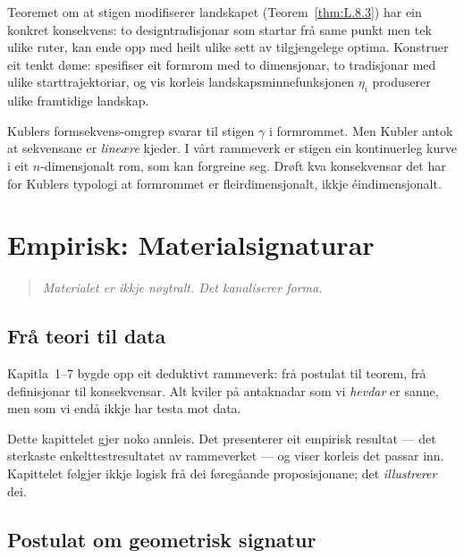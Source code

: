 \begin{exercise}[Nivå 3]\label{ex:7.5}
Teoremet om at stigen modifiserer landskapet (Teorem~\ref{thm:L.8.3})
har ein konkret konsekvens: to designtradisjonar som startar frå
same punkt men tek ulike ruter, kan ende opp med heilt ulike sett
av tilgjengelege optima. Konstruer eit tenkt døme: spesifiser eit
formrom med to dimensjonar, to tradisjonar med ulike starttrajektoriar,
og vis korleis landskapsminnefunksjonen $\eta_i$ produserer ulike
framtidige landskap.
\end{exercise}

\begin{exercise}[Nivå 3]\label{ex:7.6}
Kublers formsekvens-omgrep svarar til stigen $\gamma$ i
formrommet. Men Kubler antok at sekvensane er \emph{lineære}
kjeder. I vårt rammeverk er stigen ein kontinuerleg kurve i eit
$n$-dimensjonalt rom, som kan forgreine seg. Drøft kva
konsekvensar det har for Kublers typologi at formrommet er
fleirdimensjonalt, ikkje éindimensjonalt.
\end{exercise}


\chapter{Empirisk: Materialsignaturar}
\label{chap:empirisk}

\begin{quote}
\itshape
Materialet er ikkje nøytralt. Det kanaliserer forma.
\end{quote}

\section{Frå teori til data}

Kapitla~1--7 bygde opp eit deduktivt rammeverk: frå postulat til
teorem, frå definisjonar til konsekvensar. Alt kviler på
antaknadar som vi \emph{hevdar} er sanne, men som vi endå ikkje
har testa mot data.

Dette kapittelet gjer noko annleis. Det presenterer eit empirisk
resultat --- det sterkaste enkelttestresultatet av rammeverket ---
og viser korleis det passar inn. Kapittelet følgjer ikkje logisk
frå dei føregåande proposisjonane; det \emph{illustrerer} dei.


\section{Postulat om geometrisk signatur}

